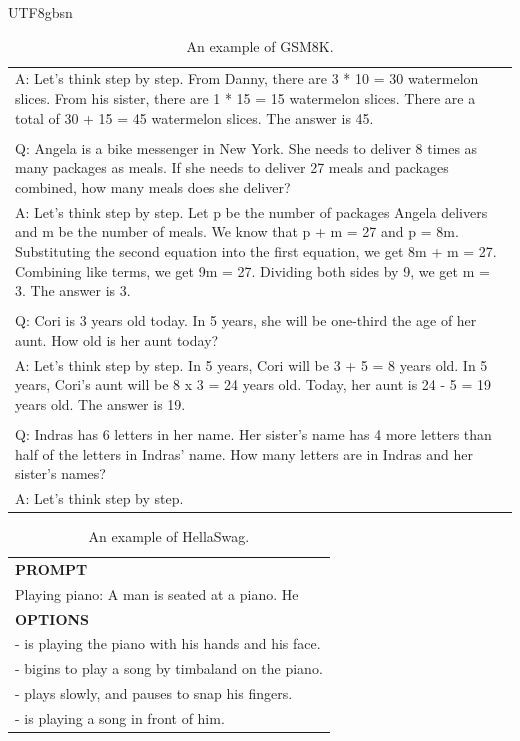 \documentclass[11pt, a4paper, logo, copyright, nonumbering]{deepseek}
\begin{document}
\begin{CJK*}{UTF8}{gbsn}
\begin{table}[h]
\begin{tabular}{p{13cm}}
\\A: Let's think step by step. From Danny, there are 3 * 10 = 30 watermelon slices. From his sister, there are 1 * 15 = 15 watermelon slices. There are a total of 30 + 15 = 45 watermelon slices. The answer is 45.
\\
\\Q: Angela is a bike messenger in New York. She needs to deliver 8 times as many packages as meals. If she needs to deliver 27 meals and packages combined, how many meals does she deliver?
\\A: Let's think step by step. Let p be the number of packages Angela delivers and m be the number of meals. We know that p + m = 27 and p = 8m. Substituting the second equation into the first equation, we get 8m + m = 27. Combining like terms, we get 9m = 27. Dividing both sides by 9, we get m = 3. The answer is 3.
\\
\\Q: Cori is 3 years old today. In 5 years, she will be one-third the age of her aunt. How old is her aunt today?
\\A: Let's think step by step. In 5 years, Cori will be 3 + 5 = 8 years old. In 5 years, Cori’s aunt will be 8 x 3 = 24 years old. Today, her aunt is 24 - 5 = 19 years old. The answer is 19.
\\
\\Q: Indras has 6 letters in her name. Her sister's name has 4 more letters than half of the letters in Indras' name. How many letters are in Indras and her sister's names?
\\A: Let's think step by step.\\
\bottomrule
\end{tabular}
    \caption{\centering An example of GSM8K.}
    \label{tab:gsm8k_eval_format_example}
\end{table}

\begin{table}[h]
    \centering \small
\begin{tabular}{p{12cm}}
\toprule
\textbf{PROMPT}\\
Playing piano: A man is seated at a piano. He\\
\midrule
\textbf{OPTIONS}\\
- is playing the piano with his hands and his face.\\
- bigins to play a song by timbaland on the piano.\\
- plays slowly, and pauses to snap his fingers.\\
- is playing a song in front of him.\\
\bottomrule
\end{tabular}
    \caption{\centering An example of HellaSwag.}
    \label{tab:hellaswag_eval_format_example}
\end{table}


\end{CJK*}
\end{document}
